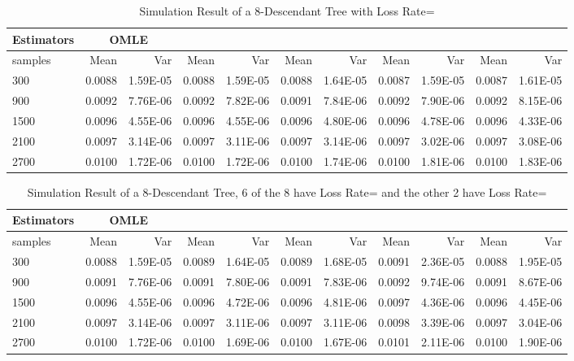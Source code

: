 \documentclass[10pt,onecolumn]{IEEEtran}
\begin{document}
\begin{table*}[th]
  \centering
  \scriptsize
  \begin{tabular}{|l|r|r|r|r|r|r|r|r|r|r|}  \hline
 Estimators &\multicolumn{2}{|c|}{OMLE} & \multicolumn{2}{|c|}{} & \multicolumn{2}{|c|}{} &\multicolumn{2}{|c|}{} & \multicolumn{2}{|c|}{}	\\ \hline
samples & Mean & Var &	Mean & Var &	Mean & Var	& Mean & Var &  Mean &	Var	\\ \hline
300&	0.0088&	1.59E-05&	0.0088&	1.59E-05&	0.0088&	1.64E-05&	0.0087&	 1.59E-05&	0.0087&	1.61E-05 \\ \hline
900&	0.0092&	7.76E-06&	0.0092&	7.82E-06&	0.0091&	7.84E-06&	0.0092&	 7.90E-06&	0.0092&	8.15E-06 \\ \hline
1500&	0.0096&	4.55E-06&	0.0096&	4.55E-06&	0.0096&	4.80E-06&	0.0096&	 4.78E-06&	0.0096&	4.33E-06 \\ \hline
2100&	0.0097&	3.14E-06&	0.0097&	3.11E-06&	0.0097&	3.14E-06&	0.0097&	 3.02E-06&	0.0097&	3.08E-06 \\ \hline
2700&	0.0100&	1.72E-06&	0.0100&	1.72E-06&	0.0100&	1.74E-06&	0.0100&	 1.81E-06&	0.0100&	1.83E-06 \\ \hline
\end{tabular}
  \caption{Simulation Result of a 8-Descendant Tree with Loss Rate=}
  \label{Tab2}
\end{table*}

\begin{table*}
\centering
\scriptsize
\begin{tabular}{|l|r|r|r|r|r|r|r|r|r|r|}  \hline
 Estimators &\multicolumn{2}{|c|}{OMLE} & \multicolumn{2}{|c|}{} & \multicolumn{2}{|c|}{} &\multicolumn{2}{|c|}{} & \multicolumn{2}{|c|}{}	\\ \hline
samples & Mean & Var &	Mean & Var &	Mean & Var	& Mean & Var &  Mean &	Var	\\ \hline
300&	0.0088&	1.59E-05&   0.0089&	1.64E-05&	0.0089&	1.68E-05&	0.0091&	 2.36E-05&	0.0088&	1.95E-05 \\ \hline
900&	0.0091&	7.76E-06&	0.0091&	7.80E-06&	0.0091&	7.83E-06&	0.0092&	 9.74E-06&	0.0091&	8.67E-06 \\ \hline
1500&	0.0096&	4.55E-06&	0.0096&	4.72E-06&	0.0096&	4.81E-06&	0.0097&	 4.36E-06&	0.0096&	4.45E-06 \\ \hline
2100&	0.0097&	3.14E-06&	0.0097&	3.11E-06&	0.0097&	3.11E-06&	0.0098&	 3.39E-06&	0.0097&	3.04E-06 \\ \hline
2700&	0.0100&	1.72E-06&	0.0100&	1.69E-06&	0.0100&	1.67E-06&	0.0101&	 2.11E-06&	0.0100&	1.90E-06 \\ \hline
\end{tabular}
  \caption{Simulation Result of a 8-Descendant Tree, 6 of the 8 have Loss Rate= and the other 2 have Loss Rate=}
  \label{Tab3}
\end{table*}
\end{document}
